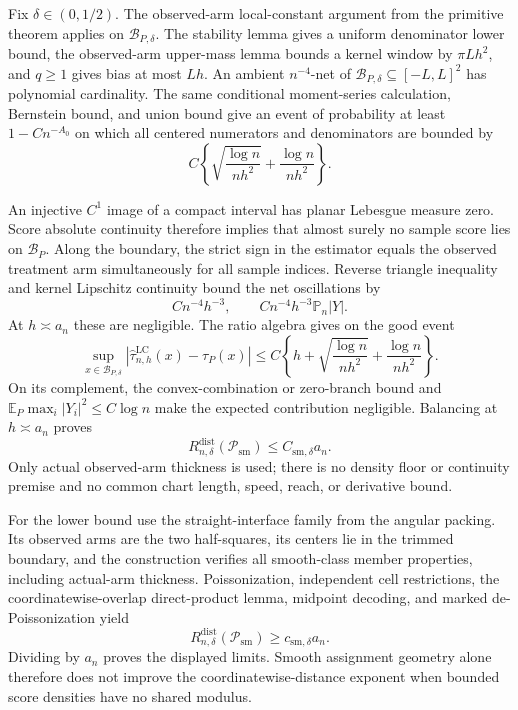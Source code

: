 Fix \(\delta\in(0,1/2)\).  The observed-arm local-constant argument from the primitive theorem applies on \(\mathcal B_{P,\delta}\).  The stability lemma gives a uniform denominator lower bound, the observed-arm upper-mass lemma bounds a kernel window by \(\pi Lh^2\), and \(q\geq1\) gives bias at most \(Lh\).  An ambient \(n^{-4}\)-net of \(\mathcal B_{P,\delta}\subseteq[-L,L]^2\) has polynomial cardinality.  The same conditional moment-series calculation, Bernstein bound, and union bound give an event of probability at least \(1-Cn^{-A_0}\) on which all centered numerators and denominators are bounded by
\[
 C\left\{\sqrt{\frac{\log n}{nh^2}}+\frac{\log n}{nh^2}\right\}.
\]

An injective \(C^1\) image of a compact interval has planar Lebesgue measure zero.  Score absolute continuity therefore implies that almost surely no sample score lies on \(\mathcal B_P\).  Along the boundary, the strict sign in the estimator equals the observed treatment arm simultaneously for all sample indices.  Reverse triangle inequality and kernel Lipschitz continuity bound the net oscillations by
\[
 Cn^{-4}h^{-3},
 \qquad Cn^{-4}h^{-3}\mathbb P_n|Y|.
\]
At \(h\asymp a_n\) these are negligible.  The ratio algebra gives on the good event
\[
 \sup_{x\in\mathcal B_{P,\delta}}
 |\widehat\tau^{\mathrm{LC}}_{n,h}(x)-\tau_P(x)|
 \leq C\left\{h+\sqrt{\frac{\log n}{nh^2}}+\frac{\log n}{nh^2}\right\}.
\]
On its complement, the convex-combination or zero-branch bound and \(\mathbb E_P\max_i|Y_i|^2\leq C\log n\) make the expected contribution negligible.  Balancing at \(h\asymp a_n\) proves
\[
 R_{n,\delta}^{\mathrm{dist}}(\mathcal P_{\mathrm{sm}})
 \leq C_{\mathrm{sm},\delta}a_n.
\]
Only actual observed-arm thickness is used; there is no density floor or continuity premise and no common chart length, speed, reach, or derivative bound.

For the lower bound use the straight-interface family from the angular packing.  Its observed arms are the two half-squares, its centers lie in the trimmed boundary, and the construction verifies all smooth-class member properties, including actual-arm thickness.  Poissonization, independent cell restrictions, the coordinatewise-overlap direct-product lemma, midpoint decoding, and marked de-Poissonization yield
\[
 R_{n,\delta}^{\mathrm{dist}}(\mathcal P_{\mathrm{sm}})
 \geq c_{\mathrm{sm},\delta}a_n.
\]
Dividing by \(a_n\) proves the displayed limits.  Smooth assignment geometry alone therefore does not improve the coordinatewise-distance exponent when bounded score densities have no shared modulus.